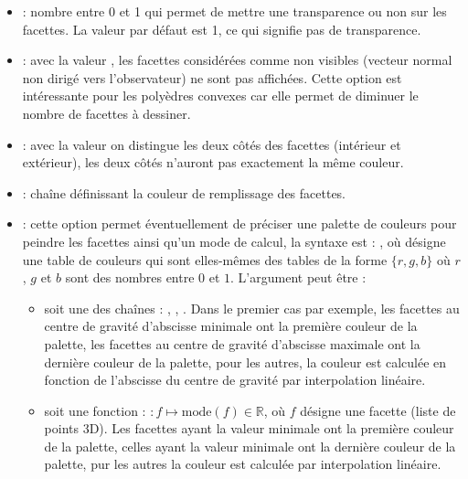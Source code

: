 \begin{itemize}
        \item {} : nombre entre 0 et 1 qui permet de mettre une transparence ou non sur les facettes. La valeur par défaut est 1, ce qui signifie pas de transparence.
        \item {} : avec la valeur \true, les facettes considérées comme non visibles (vecteur normal non dirigé vers l'observateur) ne sont pas affichées. Cette option est intéressante pour les polyèdres convexes car elle permet de diminuer le nombre de facettes à dessiner.
        \item {} : avec la valeur \true on distingue les deux côtés des facettes (intérieur et extérieur), les deux côtés n'auront pas exactement la même couleur.
        \item {} : chaîne définissant la couleur de remplissage des facettes.
        \item {} : cette option permet éventuellement de préciser une palette de couleurs pour peindre les facettes ainsi qu'un mode de calcul, la syntaxe est : , où  désigne une table de couleurs qui sont elles-mêmes des tables de la forme $\{r,g,b\}$ où $r$, $g$ et $b$ sont des nombres entre $0$ et $1$. L'argument   peut être :
            \begin{itemize}
                \item soit une des chaînes : , , . Dans le premier cas par exemple, les facettes au centre de gravité d'abscisse minimale ont la première couleur de la palette, les facettes au centre de gravité d'abscisse maximale ont la dernière couleur de la palette, pour les autres, la couleur est calculée en fonction de l'abscisse du centre de gravité par interpolation linéaire.
                \item soit une fonction : $\colon f \mapsto \mathrm{mode}(f)\in\mathbb R$, où $f$ désigne une facette (liste de points 3D). Les facettes ayant la valeur minimale ont la première couleur de la palette, celles ayant la valeur minimale ont la dernière couleur de la palette, pur les autres la couleur est calculée par interpolation linéaire.
            \end{itemize}
\end{itemize}

